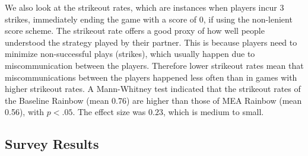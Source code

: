 \documentclass[letterpaper]{article} %
\begin{document}
We also look at the strikeout rates, which are instances when players incur 3 strikes, immediately ending the game with a score of 0, if using the non-lenient score scheme. The strikeout rate offers a good proxy of how well people understood the strategy played by their  partner. This is because players need to minimize non-successful plays (strikes), which usually happen due to miscommunication between the players. Therefore lower strikeout rates mean that miscommunications between the players happened less often than in games with higher strikeout rates.
A Mann-Whitney test indicated that the strikeout rates of the Baseline Rainbow (mean 0.76) are higher than those of MEA Rainbow (mean 0.56), with $p < .05$. The effect size was $0.23$, which is medium to small.



\subsection{Survey Results}
\end{document}
